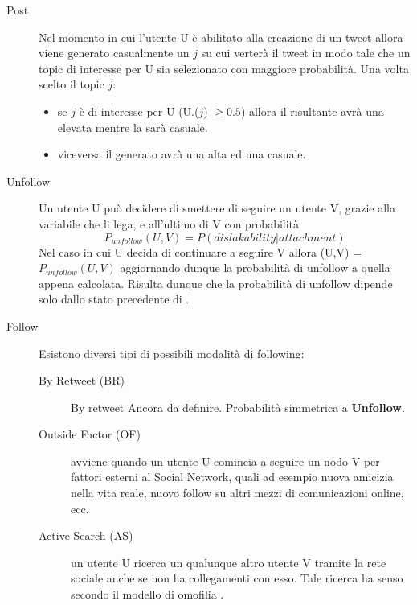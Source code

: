 \begin{description}
  \item[Post] Nel momento in cui l'utente U \`e abilitato alla 
  creazione di un tweet allora viene generato casualmente un 
  \topic{} $j$ su cui verter\`a il tweet in modo tale che un topic 
  di interesse per U sia selezionato con maggiore probabilit\`a.
  Una volta scelto il topic $j$:
  \begin{itemize}
    \item se $j$ \`e di interesse per U (U.\PI{}($j$) $\geq 0.5$)
     allora il \twt{} risultante
    avr\`a una \lika{} elevata mentre la \disla{} sar\`a casuale.
    \item viceversa il \twt{} generato avr\`a una \disla{} alta ed
    una \lika{} casuale.
  \end{itemize}
  \item[Unfollow] Un utente U pu\`o decidere di smettere di seguire 
  un utente V, grazie alla variabile \attach{} che li lega, e 
  all'ultimo \twt{} di V con probabilit\`a 
  \begin{equation*}
    P_{unfollow}(U, V) = P(dislakability|attachment)
  \end{equation*}
  Nel caso in cui U decida di continuare a seguire V allora 
  \attach{}(U,V) = $P_{unfollow}(U, V)$ aggiornando dunque la
  probabilit\`a di unfollow a quella appena calcolata.
  Risulta dunque che la probabilit\`a di unfollow dipende solo dallo 
  stato precedente di \attach{}. 
  \item[Follow] Esistono diversi tipi di possibili modalit\`a di 
  following:
    \begin{description}
      \item[By Retweet (BR)] By retweet Ancora da definire. 
      Probabilit\`a simmetrica a \textbf{Unfollow}. 
      \item[Outside Factor (OF)] avviene quando un utente U comincia
      a seguire un nodo V per fattori esterni al Social Network, 
      quali ad esempio nuova amicizia nella vita reale, nuovo
      follow su altri mezzi di comunicazioni online, ecc.
      \item[Active Search (AS)] un utente U ricerca un qualunque 
      altro utente V tramite la rete sociale anche se non ha 
      collegamenti con esso. Tale ricerca ha senso secondo il
      modello di omofilia .
       
    \end{description}
\end{description}